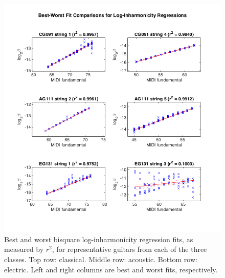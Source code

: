 \documentclass[12pt]{cmuthesis}
\begin{document}
\begin{figure}[!htbp] 
\centering
\includegraphics[scale=0.75]{best-worst-r2}
\caption{Best and worst bisquare log-inharmonicity regression fits, as measured by $r^2$, for representative guitars from each of the three classes. Top row: classical. Middle row: acoustic. Bottom row: electric. Left and right columns are best and worst fits, respectively.}
\label{fig:best-worst-r2}
\end{figure}
\end{document}
